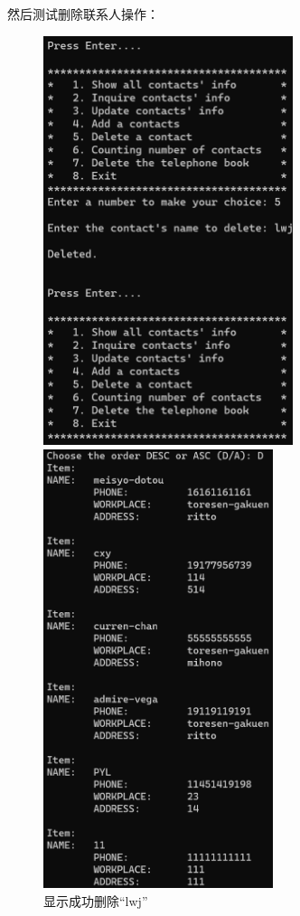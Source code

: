\documentclass[12pt, a4paper, oneside]{ctexart}
\begin{document}
然后测试删除联系人操作：

\begin{figure}[!h]
    \begin{minipage}{0.49\linewidth}
            \centering
            \includegraphics[width=0.65\textwidth]{graphic/08.png}
            \caption{显示成功删除“lwj”}
            \label{}
    \end{minipage}
    \begin{minipage}{0.49\linewidth}
            \centering
            \includegraphics[width=0.6\textwidth]{graphic/09.png}

\end{minipage}
\end{figure}
\end{document}
